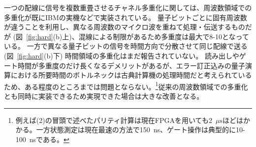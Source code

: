 \documentclass[11pt,a4j,dvipdfmx]{jarticle} 					%
\newcommand{\研究課題名}{誤り耐性量子コンピュータに向けた誤り訂正技術の開発(仮)}
\newcommand{\研究機関名}{東京大学}
\newcommand{\研究代表者氏名}{寺師弘二}
\newcommand{\研究期間の最終元号年度}{10}  %
\newcommand{\mybf}[1]{{\bfseries\sffamily#1}}
\begin{document}
一つの配線に信号を複数重畳させるチャネル多重化に関しては、周波数領域での多重化が既にIBMの実機などで実装されている。
量子ビットごとに固有周波数が違うことを利用し、異なる周波数のマイクロ波を重ねて処理・伝送するものだが (図~\ref{fig:hard}(b)上)、混線による制限があるため多重度は最大で8-10となっている。
一方で異なる量子ビットの信号を時間方向で分散させて同じ配線で送る (図~\ref{fig:hard}(b)下) 時間領域の多重化はまだ報告されていない。
読み出しやゲート時間が多重度のだけ長くなるデメリットがあるが、エラー訂正込みの量子演算における所要時間のボトルネックは古典計算機の処理時間だと考えられているため、ある程度のところまでは問題とならない。\footnote{例えば(2)の冒頭で述べたパリティ計算は現在FPGAを用いても2~${\mu \mathrm{s}}$ほどはかかる。一方状態測定は現在最速の方法で150~ns、ゲート操作は典型的に10-100~nsである。}従来の周波数領域での多重化とも同時に実装できるため実現できた場合は大きな改善となる。\\


%

\end{document}

